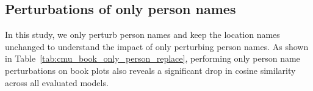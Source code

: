 \subsection{Perturbations of only person names}
In this study, we only perturb person names and keep the location names unchanged to understand the impact of only perturbing person names. As shown in Table~\ref{tab:cmu_book_only_person_replace}, performing only person name perturbations on book plots also reveals a significant drop in cosine similarity across all evaluated models.
\label{sec:person_name_perturbation_only_country_exists}

\begin{table}[h!]
\centering
\scalebox{0.78}{\begin{tabular}{ll}%
\toprule
                           Model Name &  \makecell{Cosine sim \\ per perturbation
pair} \\ %

\midrule


\end{tabular}}
\end{table}
